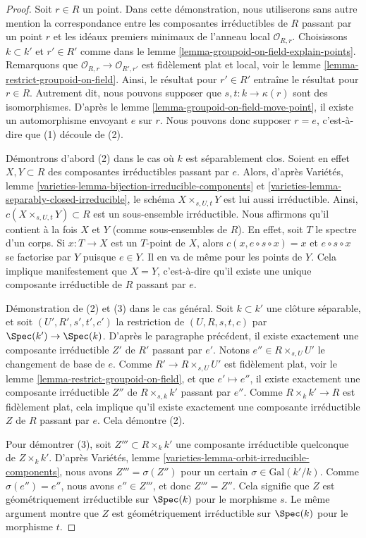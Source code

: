 \begin{proof}
Soit $r \in R$ un point.
Dans cette démonstration, nous utiliserons sans autre mention la correspondance entre les composantes irréductibles
de $R$ passant par un point $r$ et les idéaux premiers minimaux de l'anneau
local $\mathcal{O}_{R, r}$.
Choisissons $k \subset k'$ et $r' \in R'$ comme dans le
lemme \ref{lemma-groupoid-on-field-explain-points}.
Remarquons que $\mathcal{O}_{R, r} \to \mathcal{O}_{R', r'}$
est fidèlement plat et local, voir le
lemme \ref{lemma-restrict-groupoid-on-field}.
Ainsi, le résultat pour $r' \in R'$ entraîne le résultat pour $r \in R$.
Autrement dit, nous pouvons supposer que $s, t : k \to \kappa(r)$
sont des isomorphismes. D'après le
lemme \ref{lemma-groupoid-on-field-move-point},
il existe un automorphisme envoyant $e$ sur $r$.
Nous pouvons donc supposer $r = e$, c'est-à-dire que (1) découle de (2).

\medskip\noindent
Démontrons d'abord (2) dans le cas où $k$ est séparablement clos.
Soient en effet $X, Y \subset R$ des composantes irréductibles
passant par $e$. Alors, d'après
Variétés, lemme \ref{varieties-lemma-bijection-irreducible-components} et
\ref{varieties-lemma-separably-closed-irreducible},
le schéma $X \times_{s, U, t} Y$ est lui aussi irréductible.
Ainsi, $c(X \times_{s, U, t} Y) \subset R$ est un sous-ensemble irréductible.
Nous affirmons qu'il contient à la fois $X$ et $Y$ (comme sous-ensembles de $R$).
En effet, soit $T$ le spectre d'un corps. Si $x : T \to X$ est un $T$-point
de $X$, alors $c(x, e \circ s \circ x) = x$ et $e \circ s \circ x$
se factorise par $Y$ puisque $e \in Y$. Il en va de même pour les points de $Y$.
Cela implique manifestement que $X = Y$, c'est-à-dire qu'il existe une unique composante irréductible
de $R$ passant par $e$.

\medskip\noindent
Démonstration de (2) et (3) dans le cas général.
Soit $k \subset k'$ une clôture séparable, et
soit $(U', R', s', t', c')$ la restriction de
$(U, R, s, t, c)$ par $\Spec(k') \to \Spec(k)$.
D'après le paragraphe précédent, il existe exactement une composante irréductible
$Z'$ de $R'$ passant par $e'$.
Notons $e'' \in R \times_{s, U} U'$ le changement de base de $e$.
Comme $R' \to R \times_{s, U} U'$ est fidèlement plat, voir le
lemme \ref{lemma-restrict-groupoid-on-field},
et que $e' \mapsto e''$, il existe exactement une composante
irréductible $Z''$ de $R \times_{s, k} k'$ passant
par $e''$. Comme $R \times_k k' \to R$ est fidèlement
plat, cela implique qu'il existe exactement une composante irréductible $Z$ de $R$
passant par $e$. Cela démontre (2).

\medskip\noindent
Pour démontrer (3), soit $Z''' \subset R \times_k k'$ une composante irréductible quelconque
de $Z \times_k k'$. D'après
Variétés, lemme \ref{varieties-lemma-orbit-irreducible-components},
nous avons $Z''' = \sigma(Z'')$ pour un certain $\sigma \in \text{Gal}(k'/k)$.
Comme $\sigma(e'') = e''$, nous avons $e'' \in Z'''$, et donc
$Z''' = Z''$. Cela signifie que $Z$ est géométriquement irréductible
sur $\Spec(k)$ pour le morphisme $s$.
Le même argument montre que $Z$ est géométriquement irréductible
sur $\Spec(k)$ pour le morphisme $t$.
\end{proof}

